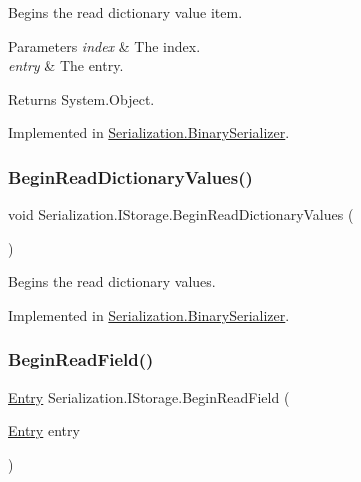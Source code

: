 Begins the read dictionary value item. 


\begin{DoxyParams}{Parameters}
{\em index} & The index.\\
\hline
{\em entry} & The entry.\\
\hline
\end{DoxyParams}
\begin{DoxyReturn}{Returns}
System.\+Object.
\end{DoxyReturn}


Implemented in \hyperlink{class_serialization_1_1_binary_serializer_afd286629a7b6d4be74e344f7b692ce4d}{Serialization.\+Binary\+Serializer}.

\mbox{\label{interface_serialization_1_1_i_storage_ad25b5e89d4ae0b91dccf8c0ce2187f15}} 
\subsubsection{\texorpdfstring{Begin\+Read\+Dictionary\+Values()}{BeginReadDictionaryValues()}}
{\footnotesize\ttfamily void Serialization.\+I\+Storage.\+Begin\+Read\+Dictionary\+Values (\begin{DoxyParamCaption}{ }\end{DoxyParamCaption})}



Begins the read dictionary values. 



Implemented in \hyperlink{class_serialization_1_1_binary_serializer_ade68463fa1bf913dd9f768b4edfed5bc}{Serialization.\+Binary\+Serializer}.

\mbox{\label{interface_serialization_1_1_i_storage_a369241f5ffd8446da4a57c72a8646f09}} 
\subsubsection{\texorpdfstring{Begin\+Read\+Field()}{BeginReadField()}}
{\footnotesize\ttfamily \hyperlink{class_serialization_1_1_entry}{Entry} Serialization.\+I\+Storage.\+Begin\+Read\+Field (\begin{DoxyParamCaption}\item[{\hyperlink{class_serialization_1_1_entry}{Entry}}]{entry }\end{DoxyParamCaption})}



